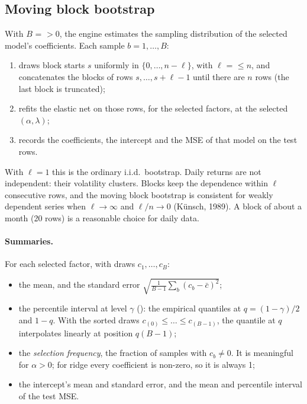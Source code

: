 \subsection{Moving block bootstrap}\label{en:sec:bootstrap}

With $B$ =  $>0$, the engine estimates the sampling distribution of
the selected model's coefficients. Each sample $b=1,\dots,B$:
\begin{enumerate}
  \item draws block starts $s$ uniformly in $\{0,\dots,n-\ell\}$, with $\ell$ =
         $\le n$, and concatenates the blocks of rows
        $s,\dots,s+\ell-1$ until there are $n$ rows (the last block is truncated);
  \item refits the elastic net on those rows, for the selected factors, at the selected
        $(\alpha,\lambda)$;
  \item records the coefficients, the intercept and the MSE of that model on the test rows.
\end{enumerate}
With $\ell=1$ this is the ordinary i.i.d.\ bootstrap. Daily returns are not independent:
their volatility clusters. Blocks keep the dependence within $\ell$ consecutive rows, and the
moving block bootstrap is consistent for weakly dependent series when
$\ell\to\infty$ and $\ell/n\to0$ (K\"unsch, 1989). A block of about a month (20 rows) is a
reasonable choice for daily data.

\paragraph{Summaries.} For each selected factor, with draws $c_1,\dots,c_B$:
\begin{itemize}
  \item the mean, and the standard error $\sqrt{\frac1{B-1}\sum_b(c_b-\bar c)^2}$;
  \item the percentile interval at level $\gamma$ (): the empirical
        quantiles at $q=(1-\gamma)/2$ and $1-q$. With the sorted draws $c_{(0)}\le\dots\le
        c_{(B-1)}$, the quantile at $q$ interpolates linearly at position $q(B-1)$;
  \item the \emph{selection frequency}, the fraction of samples with $c_b\ne0$. It is
        meaningful for $\alpha>0$; for ridge every coefficient is non-zero, so it is always
        1;
  \item the intercept's mean and standard error, and the mean and percentile interval of
        the test MSE.
\end{itemize}

